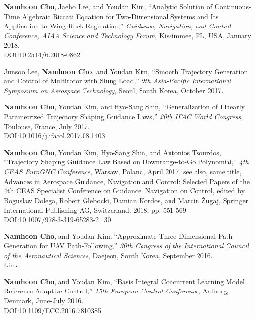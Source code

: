 \begin{enumerate}[itemsep=0.5em, label={[}C\arabic*{]}]
\item \textbf{Namhoon Cho}, Jaeho Lee, and Youdan Kim, ``Analytic Solution of Continuous-Time Algebraic Riccati Equation for Two-Dimensional Systems and Its Application to Wing-Rock Regulation,'' \textit{Guidance, Navigation, and Control Conference, AIAA Science and Technology Forum}, Kissimmee, FL, USA, January 2018. \\
\href{https://doi.org/10.2514/6.2018-0862}{DOI:10.2514/6.2018-0862}

\item Junsoo Lee, \textbf{Namhoon Cho}, and Youdan Kim, ``Smooth Trajectory Generation and Control of Multirotor with Slung Load,'' \textit{9th Asia-Pacific International Symposium on Aerospace Technology}, Seoul, South Korea, October 2017. 

\item \textbf{Namhoon Cho}, Youdan Kim, and Hyo-Sang Shin, ``Generalization of Linearly Parametrized Trajectory Shaping Guidance Laws,'' \textit{20th IFAC World Congress}, Toulouse, France, July 2017. \\
\href{https://doi.org/10.1016/j.ifacol.2017.08.1403}{DOI:10.1016/j.ifacol.2017.08.1403}

\item \textbf{Namhoon Cho}, Youdan Kim, Hyo-Sang Shin, and Antonios Tsourdos, ``Trajectory Shaping Guidance Law Based on Downrange-to-Go Polynomial,'' \textit{4th CEAS EuroGNC Conference}, Warsaw, Poland, April 2017. see also, same title, Advances in Aerospace Guidance, Navigation and Control: Selected Papers of the 4th CEAS Specialist Conference on Guidance, Navigation on Control, edited by Boguslaw Dolega, Robert Glebocki, Damian Kordos, and Marcin Żugaj, Springer International Publishing AG, Switzerland, 2018, pp. 551-569 \\
\href{https://doi.org/10.1007/978-3-319-65283-2_30}{DOI:10.1007/978-3-319-65283-2\_30}

\item \textbf{Namhoon Cho}, and Youdan Kim, ``Approximate Three-Dimensional Path Generation for UAV Path-Following,'' \textit{30th Congress of the International Council of the Aeronautical Sciences}, Daejeon, South Korea, September 2016. \\
\href{http://icas.org/ICAS_ARCHIVE/ICAS2016/data/preview/2016_0128.htm}{Link}

\item \textbf{Namhoon Cho}, and Youdan Kim, ``Basis Integral Concurrent Learning Model Reference Adaptive Control,'' \textit{15th European Control Conference}, Aalborg, Denmark, June-July 2016. \\
\href{https://doi.org/10.1109/ECC.2016.7810385}{DOI:10.1109/ECC.2016.7810385}


\end{enumerate}
